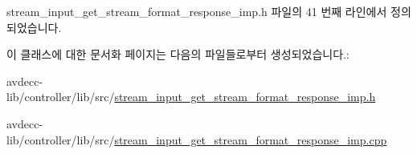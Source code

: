 stream\+\_\+input\+\_\+get\+\_\+stream\+\_\+format\+\_\+response\+\_\+imp.\+h 파일의 41 번째 라인에서 정의되었습니다.



이 클래스에 대한 문서화 페이지는 다음의 파일들로부터 생성되었습니다.\+:\begin{DoxyCompactItemize}
\item 
avdecc-\/lib/controller/lib/src/\hyperlink{stream__input__get__stream__format__response__imp_8h}{stream\+\_\+input\+\_\+get\+\_\+stream\+\_\+format\+\_\+response\+\_\+imp.\+h}\item 
avdecc-\/lib/controller/lib/src/\hyperlink{stream__input__get__stream__format__response__imp_8cpp}{stream\+\_\+input\+\_\+get\+\_\+stream\+\_\+format\+\_\+response\+\_\+imp.\+cpp}\end{DoxyCompactItemize}
